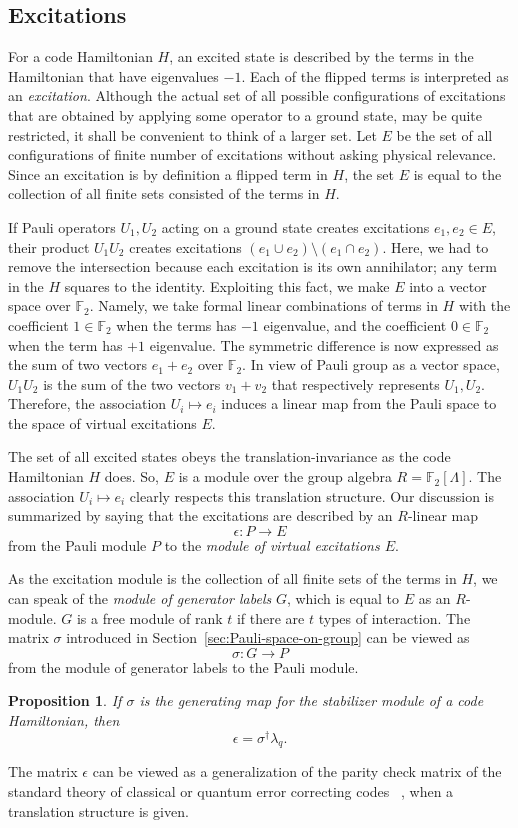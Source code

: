 \documentclass[letterpaper,12pt]{amsart}
\newtheorem{prop}[lem]{Proposition}
\theoremstyle{definition} \newtheorem{defn}{Definition}
\theoremstyle{definition} \newtheorem{rem}{Remark}
\theoremstyle{definition} \newtheorem{example}{Example}
\newcommand{\FF}{\mathbb{F}}
\begin{document}
\subsection{Excitations}

For a code Hamiltonian $H$,
an excited state is described by the terms in the Hamiltonian that have eigenvalues $-1$.
Each of the flipped terms is interpreted as an {\em excitation}.
Although the actual set of all possible configurations of excitations
that are obtained by applying some operator to a ground state, may be quite restricted,
it shall be convenient to think of a larger set.
Let $E$ be the set of all configurations of finite number of excitations without asking physical relevance.
Since an excitation is by definition a flipped term in $H$,
the set $E$ is equal to the collection of all finite sets consisted of the terms in $H$.

If Pauli operators $U_1, U_2$ acting on a ground state creates excitations $e_1, e_2 \in E$,
their product $U_1 U_2$ creates excitations $(e_1 \cup e_2) \setminus (e_1 \cap e_2)$.
Here, we had to remove the intersection because each excitation is its own annihilator;
any term in the $H$ squares to the identity.
Exploiting this fact, we make $E$ into a vector space over $\FF_2$.
Namely, we take formal linear combinations of terms in $H$
with the coefficient $1 \in \FF_2$ when the terms has $-1$ eigenvalue,
and the coefficient $0 \in \FF_2$ when the term has $+1$ eigenvalue.
The symmetric difference is now expressed as the sum of two vectors $e_1 + e_2$ over $\FF_2$.
In view of Pauli group as a vector space,
$U_1 U_2$ is the sum of the two vectors $v_1 + v_2$ that respectively represents $U_1, U_2$.
Therefore, the association $U_i \mapsto e_i$ induces 
a linear map from the Pauli space to the space of virtual excitations $E$.

The set of all excited states obeys the translation-invariance as the code Hamiltonian $H$ does.
So, $E$ is a module over the group algebra $R=\FF_2[\Lambda]$.
The association $U_i \mapsto e_i$ clearly respects this translation structure.
Our discussion is summarized by saying that the excitations are described by an $R$-linear map
\[
 \epsilon : P \to E
\]
from the Pauli module $P$ to the {\em module of virtual excitations $E$}.

As the excitation module is the collection of all finite sets of the terms in $H$,
we can speak of the {\em module of generator labels} $G$,
which is equal to $E$ as an $R$-module.
$G$ is a free module of rank $t$ if there are $t$ types of interaction.
The matrix $\sigma$ introduced in Section~\ref{sec:Pauli-space-on-group} can be viewed as
\[
 \sigma : G \to P
\]
from the module of generator labels to the Pauli module.
\begin{prop}
If $\sigma$ is the generating map for the stabilizer module of a code Hamiltonian,
then 
\[
 \epsilon = \sigma^\dagger \lambda_q .
\]
\end{prop}
The matrix $\epsilon$ can be viewed as a generalization of
the parity check matrix of the standard theory of classical or quantum error correcting codes%
~\cite{MacWilliamsSloane1977,CalderbankShor1996Good,Steane1996Multiple,Gottesman1996Saturating},
when a translation structure is given.
\end{document}
